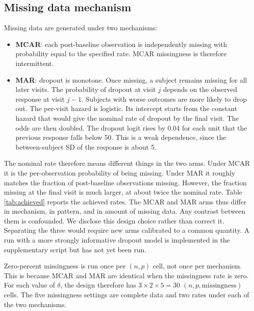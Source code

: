 \documentclass[
  11pt,
]{article}
\providecommand{\tightlist}{%
  \setlength{\itemsep}{0pt}\setlength{\parskip}{0pt}}
\begin{document}
\subsection{Missing data mechanism}\label{missing-data-mechanism}

Missing data are generated under two mechanisms:

\begin{itemize}
\tightlist
\item
  \textbf{MCAR}: each post-baseline observation is
  independently missing with probability equal to the
  specified rate. MCAR missingness is therefore intermittent.
\item
  \textbf{MAR}: dropout is monotone. Once missing, a subject
  remains missing for all later visits. The probability of
  dropout at visit \(j\) depends on the observed response at
  visit \(j-1\). Subjects with worse outcomes are more likely to
  drop out. The per-visit hazard is logistic. Its intercept
  starts from the constant hazard that would give the nominal
  rate of dropout by the final visit. The odds are then
  doubled. The dropout logit rises by 0.04 for each unit that
  the previous response falls below 50. This is a weak
  dependence, since the between-subject SD of the response is
  about 5.
\end{itemize}

The nominal rate therefore means different things in the two
arms. Under MCAR it is the per-observation probability of
being missing. Under MAR it roughly matches the fraction of
post-baseline observations missing. However, the fraction
missing at the final visit is much larger, at about twice the
nominal rate. Table \ref{tab:achieved} reports the achieved
rates. The MCAR and MAR arms thus differ in mechanism, in
pattern, and in amount of missing data. Any contrast between
them is confounded. We disclose this design choice rather
than correct it. Separating the three would require new arms
calibrated to a common quantity. A run with a more strongly
informative dropout model is implemented in the supplementary
script but has not yet been run.

Zero-percent missingness is run once per \((n, p)\) cell, not
once per mechanism. This is because MCAR and MAR are identical
when the missingness rate is zero. For each value of \(\delta\),
the design therefore has \(3 \times 2 \times 5 = 30\)
\((n, p, \text{missingness})\) cells. The five missingness
settings are complete data and two rates under each of the two
mechanisms.
\end{document}
